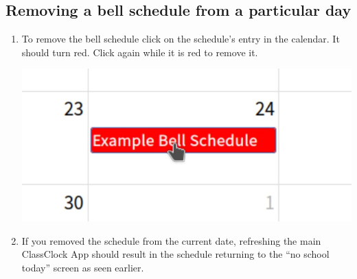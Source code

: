 \documentclass{article}
\begin{document}
\subsection{Removing a bell schedule from a particular day}
\begin{enumerate}
\item {To remove the bell schedule click on the schedule's entry in the calendar. It should turn red.
Click again while it is red to remove it.}
\begin{center}
\includegraphics[width=\textwidth]{images/delete phase1.png}
\end{center}
\item {If you removed the schedule from the current date, refreshing the main ClassClock App should result in the schedule
returning to the “no school today” screen as seen earlier.}
\end{enumerate}
\end{document}
